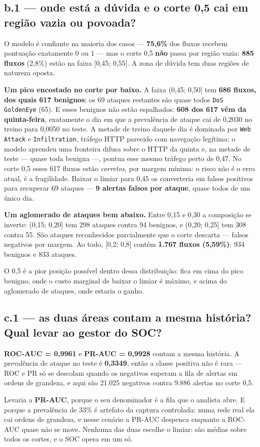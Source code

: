 \documentclass[10pt,a4paper]{article}
\newcommand{\resp}[1]{\subsection{#1}}
\begin{document}
\resp{b.1 --- onde está a dúvida e o corte 0,5 cai em região vazia ou povoada?}

O modelo é confiante na maioria dos casos --- \textbf{75,6\%} dos fluxos recebem pontuação
exatamente 0 ou 1 --- mas o corte 0,5 \textbf{não} passa por região vazia: \textbf{885 fluxos}
(2,8\%) estão na faixa [0,45; 0,55]. A zona de dúvida tem duas regiões de natureza oposta.

\textbf{Um pico encostado no corte por baixo.} A faixa (0,45; 0,50] tem \textbf{686 fluxos,
dos quais 617 benignos}; os 69 ataques restantes são quase todos \texttt{DoS GoldenEye} (65).
E esses benignos não estão espalhados: \textbf{608 dos 617 vêm da quinta-feira}, exatamente o
dia em que a prevalência de ataque cai de 0,2030 no treino para 0,0050 no teste. A metade de
treino daquele dia é dominada por \texttt{Web Attack} e \texttt{Infiltration}, tráfego HTTP
parecido com navegação legítima; o modelo aprendeu uma fronteira difusa sobre o HTTP da quinta
e, na metade de teste --- quase toda benigna ---, pontua esse mesmo tráfego perto de 0,47. No
corte 0,5 esses 617 fluxos estão \emph{corretos}, por margem mínima: o risco não é o erro
atual, é a fragilidade. Baixar o limiar para 0,45 os converteria em falsos positivos para
recuperar 69 ataques --- \textbf{9 alertas falsos por ataque}, quase todos de um único dia.

\textbf{Um aglomerado de ataques bem abaixo.} Entre 0,15 e 0,30 a composição se inverte:
(0,15; 0,20] tem 298 ataques contra 94 benignos, e (0,20; 0,25] tem 308 contra 55. São ataques
reconhecidos parcialmente que o corte descarta --- falsos negativos por margem. Ao todo,
[0,2; 0,8] contém \textbf{1.767 fluxos (5,59\%)}: 934 benignos e 833 ataques.

O 0,5 é a pior posição possível dentro dessa distribuição: fica em cima do pico benigno, onde o
custo marginal de baixar o limiar é máximo, e acima do aglomerado de ataques, onde estaria o
ganho.

\resp{c.1 --- as duas áreas contam a mesma história? Qual levar ao gestor do SOC?}

\textbf{ROC-AUC = 0,9961} e \textbf{PR-AUC = 0,9928} contam a mesma história. A prevalência de
ataque no teste é \textbf{0,3349}, então a classe positiva não é rara --- ROC e PR só se
descolam quando os negativos superam a fila de alertas em ordens de grandeza, e aqui são
21.025 negativos contra 9.886 alertas no corte 0,5.

Levaria a \textbf{PR-AUC}, porque o seu denominador é a fila que o analista abre. E porque a
prevalência de 33\% é artefato da captura controlada: numa rede real ela cai ordens de
grandeza, e nesse cenário a PR-AUC despenca enquanto a ROC-AUC quase não se move. Nenhuma das
duas escolhe o limiar: são médias sobre todos os cortes, e o SOC opera em um só.
\end{document}
